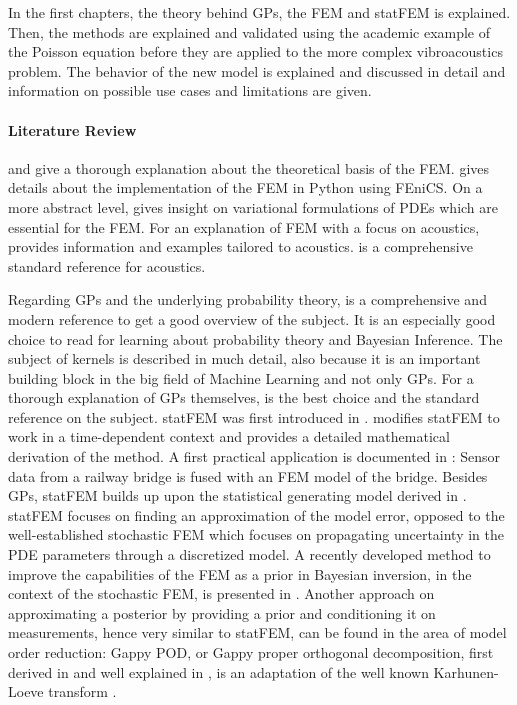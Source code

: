 \documentclass[%
  a4paper,oneside,%
  11pt,%
  smallchapters,
  style=printdev,
  extramargin,
  green,%
  rgb, <cmyk>
  ]{tubsbook}
\begin{document}
In the first chapters, the theory behind GPs, the FEM and statFEM is explained. Then, the methods are explained and validated using the academic example of the Poisson equation before they are applied to the more complex vibroacoustics problem. The behavior of the new model is explained and discussed in detail and information on possible use cases and limitations are given.

\paragraph{Literature Review}
\cite{langtangen2019} and \cite{larson2013} give a thorough explanation about the theoretical basis of the FEM. \cite{langtangen2016} gives details about the implementation of the FEM in Python using FEniCS. On a more abstract level, \cite{Lanczos1986} gives insight on variational formulations of PDEs which are essential for the FEM. For an explanation of FEM with a focus on acoustics, \cite{atalla2015} provides information and examples tailored to acoustics. \cite{moser2005} is a comprehensive standard reference for acoustics. 

Regarding GPs and the underlying probability theory, \cite{murphy2012} is a comprehensive and modern reference to get a good overview of the subject. It is an especially good choice to read for learning about probability theory and Bayesian Inference. The subject of kernels is described in much detail, also because it is an important building block in the big field of Machine Learning and not only GPs. For a thorough explanation of GPs themselves, \cite{rasmussen2006} is the best choice and the standard reference on the subject. statFEM was first introduced in \cite{girolami2021}. \cite{Duffin2020} modifies statFEM to work in a time-dependent context and provides a detailed mathematical derivation of the method. A first practical application is documented in \cite{Febrianto2021}: Sensor data from a railway bridge is fused with an FEM model of the bridge. Besides GPs, statFEM builds up upon the statistical generating model derived in \cite{kennedy2001}. statFEM focuses on finding an approximation of the model error, opposed to the well-established stochastic FEM \cite{Stefanou2009} which focuses on propagating uncertainty in the PDE parameters through a discretized model. A recently developed method to improve the capabilities of the FEM as a prior in Bayesian inversion, in the context of the stochastic FEM, is presented in \cite{Abdulle2021}. 
Another approach on approximating a posterior by providing a prior and conditioning it on measurements, hence very similar to statFEM, can be found in the area of model order reduction: Gappy POD, or Gappy proper orthogonal decomposition, first derived in \cite{Everson1995} and well explained in \cite{StevenL.Brunton2019}, is an adaptation of the well known Karhunen-Loeve transform \cite{Rao2001, Loeve1994}. 
\end{document}
